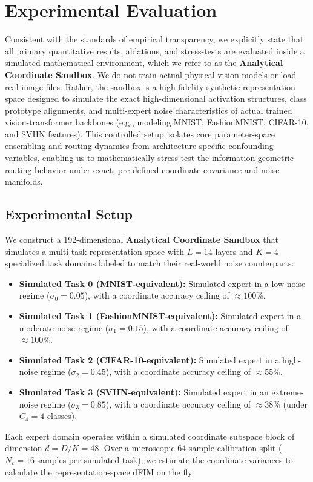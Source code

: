 \section{Experimental Evaluation}
\label{sec:experiments}

Consistent with the standards of empirical transparency, we explicitly state that all primary quantitative results, ablations, and stress-tests are evaluated inside a simulated mathematical environment, which we refer to as the \textbf{Analytical Coordinate Sandbox}. We do not train actual physical vision models or load real image files. Rather, the sandbox is a high-fidelity synthetic representation space designed to simulate the exact high-dimensional activation structures, class prototype alignments, and multi-expert noise characteristics of actual trained vision-transformer backbones (e.g., modeling MNIST, FashionMNIST, CIFAR-10, and SVHN features). This controlled setup isolates core parameter-space ensembling and routing dynamics from architecture-specific confounding variables, enabling us to mathematically stress-test the information-geometric routing behavior under exact, pre-defined coordinate covariance and noise manifolds.

\subsection{Experimental Setup}
We construct a 192-dimensional \textbf{Analytical Coordinate Sandbox} that simulates a multi-task representation space with $L=14$ layers and $K=4$ specialized task domains labeled to match their real-world noise counterparts:
\begin{itemize}\setlength{\itemsep}{0.5pt}\setlength{\parskip}{0pt}
    \item \textbf{Simulated Task 0 (MNIST-equivalent):} Simulated expert in a low-noise regime ($\sigma_0 = 0.05$), with a coordinate accuracy ceiling of $\approx 100\%$.
    \item \textbf{Simulated Task 1 (FashionMNIST-equivalent):} Simulated expert in a moderate-noise regime ($\sigma_1 = 0.15$), with a coordinate accuracy ceiling of $\approx 100\%$.
    \item \textbf{Simulated Task 2 (CIFAR-10-equivalent):} Simulated expert in a high-noise regime ($\sigma_2 = 0.45$), with a coordinate accuracy ceiling of $\approx 55\%$.
    \item \textbf{Simulated Task 3 (SVHN-equivalent):} Simulated expert in an extreme-noise regime ($\sigma_3 = 0.85$), with a coordinate accuracy ceiling of $\approx 38\%$ (under $C_4 = 4$ classes).
\end{itemize}
Each expert domain operates within a simulated coordinate subspace block of dimension $d = D/K = 48$. Over a microscopic 64-sample calibration split ($N_c = 16$ samples per simulated task), we estimate the coordinate variances to calculate the representation-space dFIM on the fly.

